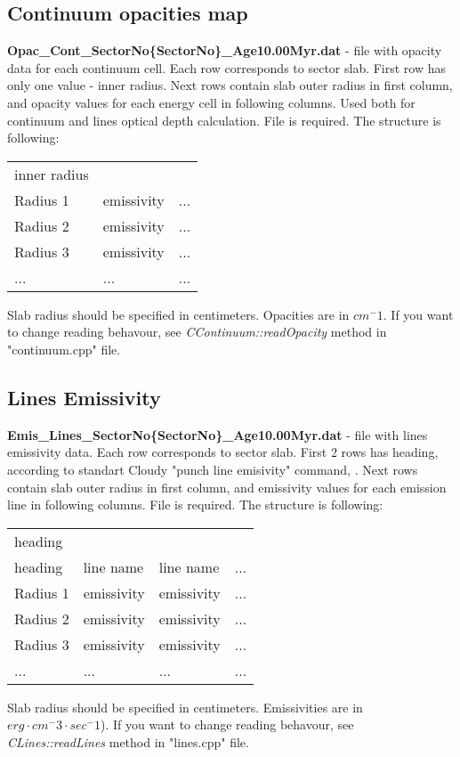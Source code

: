 \documentclass[a4paper]{article}
\begin{document}
\subsection{Continuum opacities map}
{\bf Opac\_Cont\_SectorNo\{SectorNo\}\_Age10.00Myr.dat} - file with opacity data for each continuum cell. Each row
corresponds to sector slab. First row has only one value - inner radius. Next rows contain slab outer radius in first column, 
and opacity values for each energy cell in following columns. Used both for continuum and lines optical depth calculation. 
File is required.
The structure is following:
\begin{table}[H]
    \begin{tabular}{lll}
        inner radius & & \\
        Radius 1 & emissivity & ... \\
        Radius 2 & emissivity & ... \\
        Radius 3 & emissivity & ... \\
        ... & ... & ... \\
    \end{tabular}
\end{table}
Slab radius should be specified in centimeters. Opacities are in $cm^-1$.
If you want to change reading behavour, see {\it CContinuum::readOpacity} method in "continuum.cpp" file.

\subsection{Lines Emissivity}
\label{dataLines}
{\bf Emis\_Lines\_SectorNo\{SectorNo\}\_Age10.00Myr.dat} - file with lines emissivity data. Each row
corresponds to sector slab. First 2 rows has heading, according to standart Cloudy 
"punch line emisivity" command, \cite{Cloudy}. Next rows contain slab outer radius in first column, 
and emissivity values for each emission line in following columns. File is required.
The structure is following:
\begin{table}[H]
    \begin{tabular}{llll}
        heading & & & \\
        heading & line name & line name & ...\\
        Radius 1 & emissivity & emissivity & ... \\
        Radius 2 & emissivity & emissivity & ... \\
        Radius 3 & emissivity & emissivity & ... \\
        ... & ... & ... & ... \\
    \end{tabular}
\end{table}
Slab radius should be specified in centimeters. Emissivities are in $erg \cdot cm^-3 \cdot sec^-1$).
If you want to change reading behavour, see {\it CLines::readLines} method in "lines.cpp" file.
\end{document}
